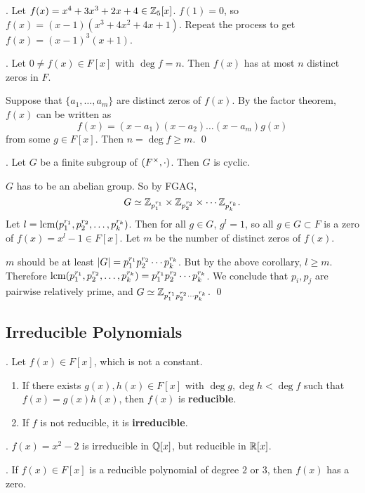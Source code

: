 \ex. Let \(f(x) = x^4 + 3x^3 + 2x + 4 \in \mathbb{Z}_5[x]\). \(f(1) = 0\), so \(f(x) = (x-1)(x^3 + 4x^2 + 4x + 1)\). Repeat the process to get \(f(x) = (x-1)^3(x+1)\).

\cor. Let \(0 \neq f(x) \in F[x]\) with \(\deg f = n\). Then \(f(x)\) has at most \(n\) distinct zeros in \(F\).

\pf Suppose that \(\{a_1, \dots, a_m\}\) are distinct zeros of \(f(x)\). By the factor theorem, \(f(x)\) can be written as
\[
    f(x) = (x - a_1)(x - a_2) \dots (x-a_m)g(x)
\]
from some \(g \in F[x]\). Then \(n = \deg f \geq m\). \qed

\cor. Let \(G\) be a finite subgroup of \((F^\times, \cdot)\). Then \(G\) is cyclic.

\pf \(G\) has to be an abelian group. So by FGAG,
\[
    G \simeq \mathbb{Z}_{p_1^{r_1}} \times \mathbb{Z}_{p_2^{r_2}} \times \cdots \mathbb{Z}_{p_k^{r_k}}.
\]
Let \(l = {\rm lcm} (p_1^{r_1}, p_2^{r_2}, \dots, p_k^{r_k})\). Then for all \(g \in G\), \(g^l = 1\), so all \(g \in G \subset F\) is a zero of \(f(x) = x^l - 1 \in F[x]\). Let \(m\) be the number of distinct zeros of \(f(x)\).

\(m\) should be at least \(\left| G \right| = p_1^{r_1}p_2^{r_2}\cdots p_k^{r_k}\). But by the above corollary, \(l \geq m\). Therefore \({\rm lcm} (p_1^{r_1}, p_2^{r_2}, \dots, p_k^{r_k}) = p_1^{r_1}p_2^{r_2}\cdots p_k^{r_k}\). We conclude that \(p_i, p_j\) are pairwise relatively prime, and \(G \simeq \mathbb{Z}_{p_1^{r_1}p_2^{r_2}\cdots p_k^{r_k}}\). \qed

\pagebreak

\subsection*{Irreducible Polynomials}

.  Let \(f(x) \in F[x]\), which is not a constant.
\begin{enumerate}
    \item If there exists \(g(x), h(x) \in F[x]\) with \(\deg g, \deg h < \deg f\) such that \(f(x) = g(x)h(x)\), then \(f(x)\) is \textbf{reducible}.
    \item If \(f\) is not reducible, it is \textbf{irreducible}.
\end{enumerate}

\ex. \(f(x) = x^2 - 2\) is irreducible in \(\mathbb{Q}[x]\), but reducible in \(\mathbb{R}[x]\).

\thm. If \(f(x) \in F[x]\) is a reducible polynomial of degree \(2\) or \(3\), then \(f(x)\) has a zero.

